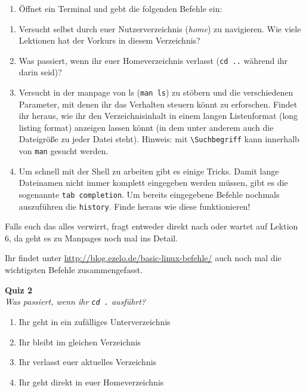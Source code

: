 \begin{praxis}
    \begin{enumerate}
        \item Öffnet ein Terminal und gebt die folgenden Befehle ein:
    \end{enumerate}
\end{praxis}

\begin{spiel}
    \begin{enumerate}
        \item Versucht selbst durch euer Nutzerverzeichnis (\emph{home}) zu navigieren.
              Wie viele Lektionen hat der Vorkurs in diesem Verzeichnis?
        \item Was passiert, wenn ihr euer Homeverzeichnis verlasst (\texttt{cd ..}
              während ihr darin seid)?
        \item Versucht in der manpage von ls (\texttt{man ls}) zu stöbern und die
              verschiedenen Parameter, mit denen ihr das Verhalten steuern könnt zu
              erforschen. Findet ihr heraus, wie ihr den Verzeichnisinhalt in einem
              langen Listenformat (long listing format) anzeigen lassen könnt (in dem
              unter anderem auch die Dateigröße zu jeder Datei steht). 
              Hinweis: mit \texttt{\textbackslash Suchbegriff} kann innerhalb von \texttt{man} gesucht werden.
        \item Um schnell mit der Shell zu arbeiten gibt es einige Tricks. 
        Damit lange Dateinamen nicht immer komplett eingegeben werden müssen, gibt es die sogenannte \texttt{tab completion}. 
        Um bereits eingegebene Befehle nochmals auszuführen die \texttt{history}. Finde heraus wie diese funktionieren!
    \end{enumerate}
  \end{spiel}


Falls euch das alles verwirrt, fragt entweder direkt nach oder wartet auf
Lektion 6, da geht es zu Manpages noch mal ins Detail.

Ihr findet unter \url{http://blog.ezelo.de/basic-linux-befehle/} auch noch mal
die wichtigsten Befehle zusammengefasst.

\textbf{Quiz 2}\\
\textit{Was passiert, wenn ihr \texttt{cd .} ausführt?}
\begin{enumerate}[label=\alph*)]
    \item Ihr geht in ein zufälliges Unterverzeichnis
    \item Ihr bleibt im gleichen Verzeichnis
    \item Ihr verlasst euer aktuelles Verzeichnis
    \item Ihr geht direkt in euer Homeverzeichnis
\end{enumerate}